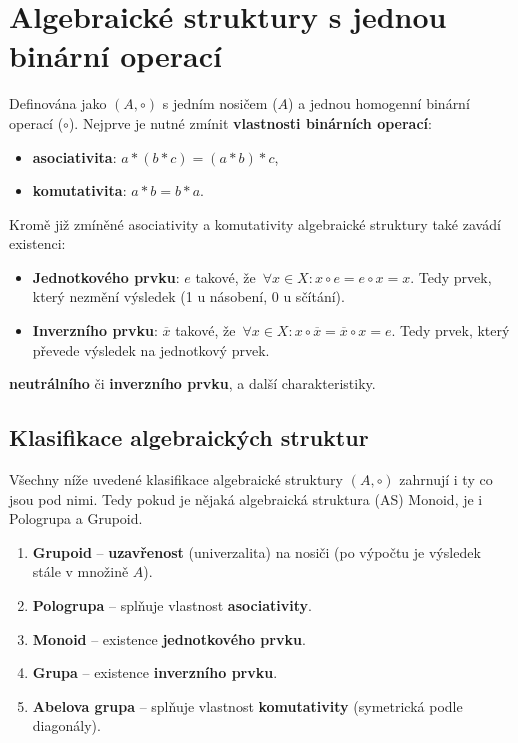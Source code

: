 \section{Algebraické struktury s jednou binární operací}
Definována jako $(A, \circ)$ s jedním nosičem ($ A $) a jednou homogenní binární operací ($ \circ $). Nejprve je nutné zmínit \textbf{vlastnosti binárních operací}:
\begin{itemize}
    \item \textbf{asociativita}: $a * (b * c) = (a * b) * c$,
    \item \textbf{komutativita}: $a * b = b * a$.
\end{itemize}
Kromě již zmíněné asociativity a komutativity algebraické struktury také zavádí existenci:
\begin{itemize}
    \item \textbf{Jednotkového prvku}: $e$ takové, že $\forall x \in X: x \circ e = e \circ x = x$. Tedy prvek, který nezmění výsledek (1 u násobení, 0 u sčítání).
    \item \textbf{Inverzního prvku}: $\overline{x}$ takové, že $\forall x \in X: x \circ \overline{x} = \overline{x} \circ x = e$. Tedy prvek, který převede výsledek na jednotkový prvek.
\end{itemize}
\textbf{neutrálního} či \textbf{inverzního prvku}, a další charakteristiky.

\subsection{Klasifikace algebraických struktur}
Všechny níže uvedené klasifikace algebraické struktury $(A, \circ)$ zahrnují i ty co jsou pod nimi. Tedy pokud je nějaká algebraická struktura (AS) Monoid, je i Pologrupa a Grupoid.
\begin{enumerate}
    \item \textbf{Grupoid} -- \textbf{uzavřenost} (univerzalita) na nosiči (po výpočtu je výsledek stále v množině $A$).
    \item \textbf{Pologrupa} -- splňuje vlastnost \textbf{asociativity}.
    \item \textbf{Monoid} -- existence \textbf{jednotkového prvku}.
    \item \textbf{Grupa} -- existence \textbf{inverzního prvku}.
    \item \textbf{Abelova grupa} -- splňuje vlastnost \textbf{komutativity} (symetrická podle diagonály).
\end{enumerate}


